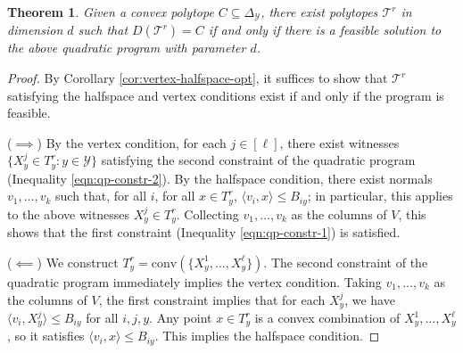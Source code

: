 \documentclass[12pt]{article}
\newcommand{\simplex}{\Delta_\Y}
\newcommand{\T}{\mathcal{T}}
\newcommand{\Y}{\mathcal{Y}}
\newcommand{\inprod}[2]{\langle #1, #2 \rangle}%
\newcommand{\conv}{\mathrm{conv}}
\newtheorem{theorem}{Theorem}
\begin{document}
  \begin{theorem}
  	Given a convex polytope $C \subseteq \simplex$, there exist polytopes $\T^r$ in dimension $d$ such that $D(\T^r) = C$ if and only if there is a feasible solution to the above quadratic program with parameter $d$.
  \end{theorem}
  \begin{proof}
    By Corollary \ref{cor:vertex-halfspace-opt}, it suffices to show that $\T^r$ satisfying the halfspace and vertex conditions exist if and only if the program is feasible.

    ($\implies$) 
    By the vertex condition, for each $j \in [\ell]$, there exist witnesses $\{X^j_y \in T^r_y : y \in \Y\}$ satisfying the second constraint of the quadratic program (Inequality \ref{eqn:qp-constr-2}).
    By the halfspace condition, there exist normals $v_1, \dots, v_k$ such that, for all $i$, for all $x \in T^r_y$, $\inprod{v_i}{x} \leq B_{iy}$; in particular, this applies to the above witnesses $X^j_y \in T^r_y$.
    Collecting $v_1,\dots,v_k$ as the columns of $V$, this shows that the first constraint (Inequality \ref{eqn:qp-constr-1}) is satisfied.

    \bigskip
    ($\impliedby$)
    We construct $T^r_y = \conv(\{X^1_y, \ldots, X^{\ell}_y\})$.
    The second constraint of the quadratic program immediately implies the vertex condition.
    Taking $v_1,\dots,v_k$ as the columns of $V$, the first constraint implies that for each $X^j_y$, we have $\inprod{v_i}{X^j_y} \leq B_{iy}$ for all $i,j,y$.
    Any point $x \in T^r_y$ is a convex combination of $X^1_y,\ldots,X^{\ell}_y$, so it satisfies $\inprod{v_i}{x} \leq B_{iy}$.
    This implies the halfspace condition.  %


\end{proof}
\end{document}
